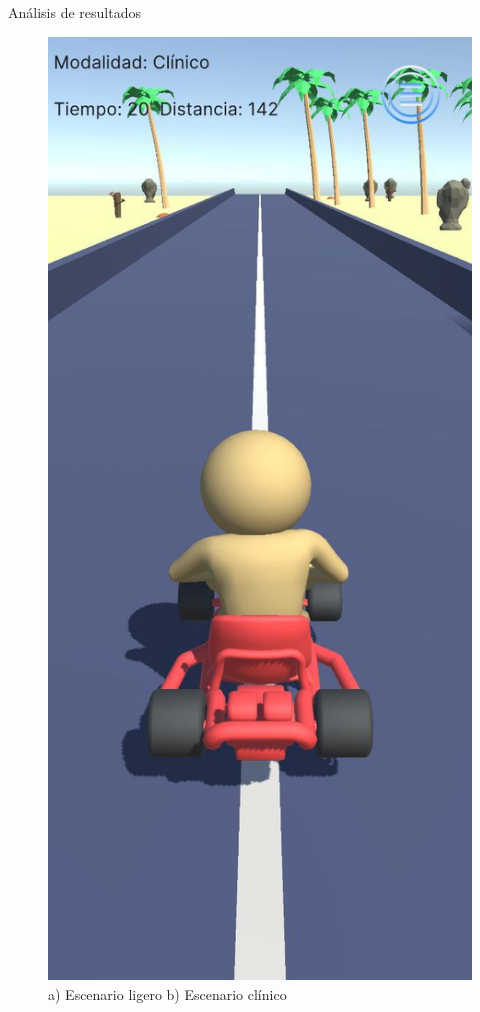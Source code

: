 \begin{thesischapter}{3} {Análisis de resultados}
\begin{figure}[ht]
        \includegraphics[scale=0.17]{images/ui/6.jpg}
        \caption{a) Escenario ligero b) Escenario clínico}
        \label{fig: diagram-game}
    \end{figure}


\end{thesischapter}
